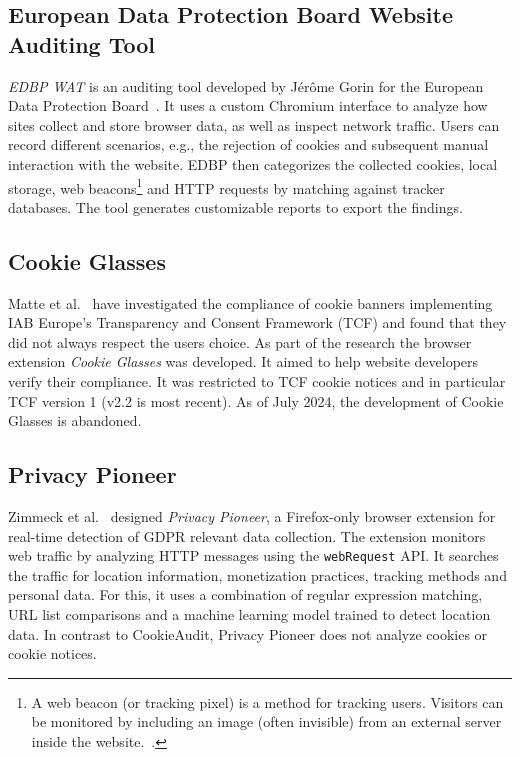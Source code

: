 \subsection{European Data Protection Board Website Auditing Tool}
\emph{EDBP WAT} is an auditing tool developed by Jérôme Gorin for the European Data Protection Board~\cite{gorin2024edpb}.
It uses a custom Chromium interface to analyze how sites collect and store browser data, as well as inspect network traffic. 
Users can record different scenarios, e.g., the rejection of cookies and subsequent manual interaction with the website.
EDBP then categorizes the collected cookies, local storage, web beacons\footnote{
A web beacon (or tracking pixel) is a method for tracking users. 
Visitors can be monitored by including an image (often invisible) from an external server inside the website.~\cite{smith1999web}.
} and HTTP requests by matching against tracker databases.
The tool generates customizable reports to export the findings.

\subsection{Cookie Glasses}
Matte et al.~\cite{matte2020cookiebannersrespectchoice} have investigated the compliance of cookie banners implementing IAB Europe’s Transparency and Consent Framework (TCF) and found that they did not always respect the users choice.
As part of the research the browser extension \emph{Cookie Glasses} was developed.
It aimed to help website developers verify their compliance.
It was restricted to TCF cookie notices and in particular TCF version 1 (v2.2 is most recent).
As of July 2024, the development of Cookie Glasses is abandoned.

\subsection{Privacy Pioneer}
Zimmeck et al.~\cite{zimmeck2024pioneer} designed \emph{Privacy Pioneer}, a Firefox-only browser extension for real-time detection of GDPR relevant data collection.
The extension monitors web traffic by analyzing HTTP messages using the \verb|webRequest| API.
It searches the traffic for location information, monetization practices, tracking methods and personal data. 
For this, it uses a combination of regular expression matching, URL list comparisons and a machine learning model trained to detect location data.
In contrast to CookieAudit, Privacy Pioneer does not analyze cookies or cookie notices.

